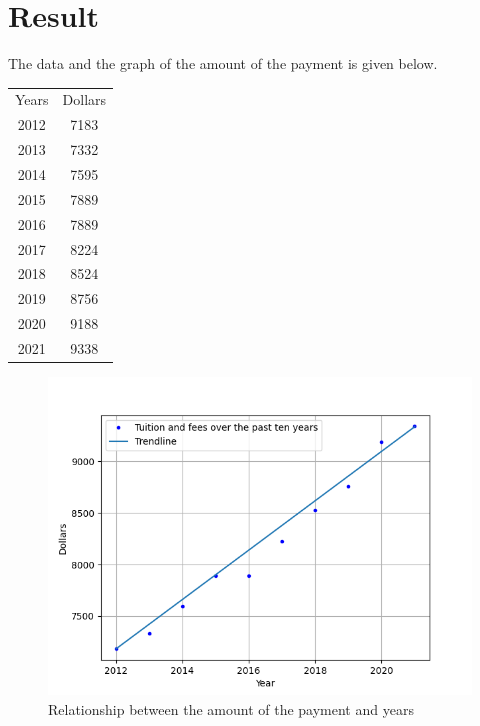 \section{Result}
The data and the graph of the amount of the payment is given below.
\begin{center}
\begin{tabular}{cc}
Years&Dollars\\
2012&7183\\
2013&7332\\
2014&7595\\
2015&7889\\
2016&7889\\
2017&8224\\
2018&8524\\
2019&8756\\
2020&9188\\
2021&9338\\
\end{tabular}
\end{center}
\begin{figure}
	\includegraphics[scale=0.75]{projectgraph.png}
	\caption{Relationship between the amount of the payment and years}
	\label{fig1}
\end{figure}


